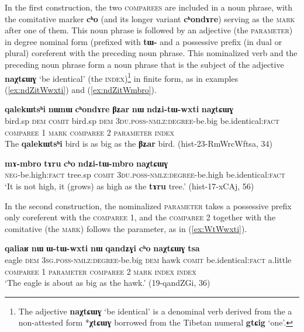 \documentclass[oneside,a4paper,11pt]{article}
\newcommand{\ipa}[1]{{\phon\textbf{#1}}} %
\newcommand{\forme}[2]{\ipa{#1} `#2'}
\begin{document}
In the first construction, the two \textsc{comparees} are included in a noun phrase, with the comitative marker \ipa{cʰo} (and its longer variant \ipa{cʰondɤre}) serving as the \textsc{mark} after one of them. This noun phrase is followed by an adjective (the \textsc{parameter}) in degree nominal form (prefixed with \ipa{tɯ-} and a possessive prefix (in dual or plural) coreferent with the preceding noun phrase. This nominalized verb and the preceding noun phrase form a noun phrase that is the subject of the adjective \forme{naχtɕɯɣ}{be identical} (the \textsc{index})\footnote{The adjective \forme{naχtɕɯɣ}{be identical} is a denominal verb derived from the a non-attested form *\ipa{χtɕɯɣ} borrowed from the Tibetan numeral \forme{gtɕig}{one}. } in finite form, as in examples (\ref{ex:ndZitWwxti}) and (\ref{ex:ndZitWmbro}).

\begin{exe}
\ex \label{ex:ndZitWwxti}
\glll
\ipa{qalekɯtsʰi} 	\ipa{nɯnɯ} 	\ipa{cʰondɤre} 	\ipa{βʑar} 	\ipa{nɯ} 	\ipa{ndʑi-tɯ-wxti} 	\ipa{naχtɕɯɣ} \\
bird.sp \textsc{dem} \textsc{comit} bird.sp \textsc{dem} \textsc{3du.poss-nmlz:degree}-be.big be.identical:\textsc{fact} \\
{\textsc{comparee} 1} { } \textsc{mark} {\textsc{comparee} 2} { } \textsc{parameter} \textsc{index} \\
\glt The \ipa{qalekɯtsʰi} bird is as big as the \ipa{βʑar} bird. (hist-23-RmWrcWftsa, 34)
\end{exe}

\begin{exe}
\ex \label{ex:ndZitWmbro}
\gll 
\ipa{mɤ-mbro} 	\ipa{tɤru} 	\ipa{cʰo} 	\ipa{ndʑi-tɯ-mbro} 	\ipa{naχtɕɯɣ} \\
\textsc{neg}-be.high:\textsc{fact} tree.sp \textsc{comit} \textsc{3du.poss-nmlz:degree}-be.high be.identical:\textsc{fact} \\
\glt `It is not high, it (grows) as high as the \ipa{tɤru} tree.' (hist-17-xCAj, 56)
\end{exe}

In the second construction, the nominalized \textsc{parameter} takes a possessive prefix only coreferent with the \textsc{comparee} 1, and the \textsc{comparee} 2 together with the comitative (the \textsc{mark}) follows the parameter, as in (\ref{ex:WtWwxti}).

\begin{exe}
\ex \label{ex:WtWwxti}
\glll
\ipa{qaliaʁ} 	\ipa{nɯ} 	\ipa{ɯ-tɯ-wxti} 	\ipa{nɯ} 	\ipa{qandʑɣi} 	\ipa{cʰo} 	\ipa{naχtɕɯɣ} 	\ipa{tsa} 	\\
eagle \textsc{dem} \textsc{3sg.poss-nmlz:degree}-be.big \textsc{dem} hawk \textsc{comit} be.identical:\textsc{fact} a.little  \\
{\textsc{comparee} 1} { } \textsc{parameter} { } {\textsc{comparee} 2} \textsc{mark} \textsc{index}  \textsc{index} \\
\glt `The eagle is about as big as the hawk.' (19-qandZGi, 36)
\end{exe}
\end{document}
